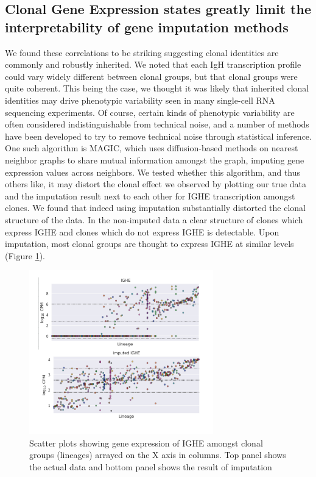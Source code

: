 \subsection{Clonal Gene Expression states greatly limit the interpretability of gene imputation methods}
We found these correlations to be striking suggesting clonal identities are commonly and robustly inherited. We noted that each IgH transcription profile could vary widely different between clonal groups, but that clonal groups were quite coherent. This being the case, we thought it was likely that inherited clonal identities may drive phenotypic variability seen in many single-cell RNA sequencing experiments. Of course, certain kinds of phenotypic variability are often considered indistinguishable from technical noise, and a number of methods have been developed to try to remove technical noise through statistical inference. One such algorithm is MAGIC\cite{van2018recovering}, which uses diffusion-based methods on nearest neighbor graphs to share mutual information amongst the graph, imputing gene expression values across neighbors. We tested whether this algorithm, and thus others like, it may distort the clonal effect we observed by plotting our true data and the imputation result next to each other for IGHE transcription amongst clones. We found that indeed using imputation substantially distorted the clonal structure of the data. In the non-imputed data a clear structure of clones which express IGHE and clones which do not express IGHE is detectable. Upon imputation, most clonal groups are thought to express IGHE at similar levels (Figure \ref{fig:paper2_Imputation_limits}).  
\begin{figure}[htb!]
\centering
\includegraphics[width=8cm, keepaspectratio]{figs/prelim_InVitro/Imputation_limits.pdf}
\caption[Concordant switch transcription states amongst clones are clobbered by imputation]{Scatter plots showing gene expression of IGHE amongst clonal groups (lineages) arrayed on the X axis in columns. Top panel shows the actual data and bottom panel shows the result of imputation}
\label{fig:paper2_Imputation_limits}
\end{figure}

